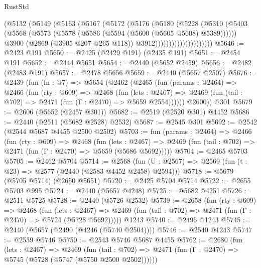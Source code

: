 \begin{lexlean}{RustStd}
\begin{coremodule}
{\begin{coremodule}
{{{{{{{{{{{{                          (@5132
                            (@5149
                              (@5163
                                (@5167
                                  (@5172
                                    (@5176
                                      (@5180
                                        (@5228
                                          (@5310
                                            (@5403
                                              (@5568
                                                (@5573
                                                  (@5578
                                                    (@5586 (@5594 (@5600 (@5605 @5608) @5389))))))
                                              @3900
                                              (@2869 (@3905 @207 @265 @118))
                                              @3912)))))))))))))))))))))
@5646 := @2423 @191
@5650 := @2425 (@2429 @191) (@2435 @191)
@5651 := @2454 @191
@5652 := @2444 @5651
@5654 := @2440 (@5652 @2459)
@5656 := @2482 (@2483 @191)
@5657 := @2478 @5656
@5659 := @2440 (@5657 @2507)
@5676 := @2439
    (fun (fn : @7) =>
    @5654
      (@2462
        (@2465
          (fun (params : @2464) =>
          @2466
            (fun (rty : @609) =>
            @2468
              (fun (lets : @2467) =>
              @2469 (fun (tail : @702) => @2471 (fun (Γ : @2470) => @5659 @2554))))))
        @2600))
    @301
@5679 := @2606 (@5652 (@2457 @301))
@5682 := @2519 (@2520 @301) @4452
@5686 := @2440 (@2511 (@5682 @2528) @2532)
@5687 := @2545 @301
@5692 := @2542 (@2544 @5687 @4455 @2500 @2502)
@5703 := fun (params : @2464) =>
  @2466
    (fun (rty : @609) =>
    @2468
      (fun (lets : @2467) =>
      @2469 (fun (tail : @702) => @2471 (fun (Γ : @2470) => @5659 (@5686 @5692)))))
@5704 := @2465 @5703
@5705 := @2462 @5704
@5714 := @2568 (fun (U : @2567) => @2569 (fun (t : @23) => @2577 (@2440 (@2583 @4452 @2458) @2594)))
@5718 := @5679 (@5705 @5714) (@2650 @5651)
@5720 := @2425 @5704 @5714
@5722 := @2655 @5703 @995
@5724 := @2440 (@5657 @4248)
@5725 := @5682 @4251
@5726 := @2511 @5725
@5728 := @2440 (@5726 @2532)
@5739 := @2658
    (fun (rty : @609) =>
    @2468
      (fun (lets : @2467) =>
      @2469 (fun (tail : @702) => @2471 (fun (Γ : @2470) => @5724 (@5728 @5692)))))
    @1243
@5740 := @2496 @1243
@5745 := @2440 (@5657 (@2490 (@4246 (@5740 @2504))))
@5746 := @2540 @1243
@5747 := @2539 @5746
@5750 := @2543 @5746 @5687 @4455
@5762 := @2680
    (fun (lets : @2467) =>
    @2469
      (fun (tail : @702) => @2471 (fun (Γ : @2470) => @5745 (@5728 (@5747 (@5750 @2500 @2502))))))
}}}}}}}}}}}}
\end{coremodule}}
\end{coremodule}
\end{lexlean}
